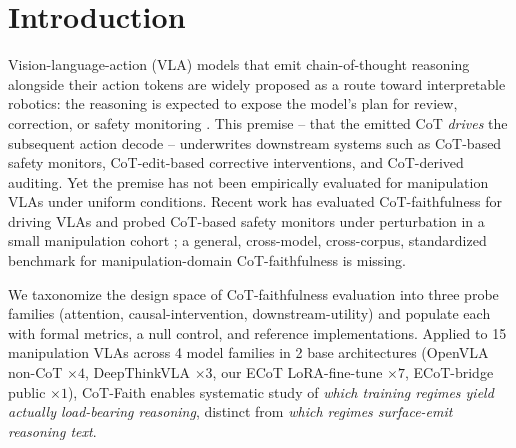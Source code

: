 \documentclass{article}
\begin{document}
\section{Introduction}
\label{sec:intro}

Vision-language-action (VLA) models that emit chain-of-thought reasoning alongside their action tokens are widely proposed as a route toward interpretable robotics: the reasoning is expected to expose the model's plan for review, correction, or safety monitoring \citep{ecot,cotvla,ecotlite,deepthinkvla}. This premise -- that the emitted CoT \emph{drives} the subsequent action decode -- underwrites downstream systems such as CoT-based safety monitors, CoT-edit-based corrective interventions, and CoT-derived auditing. Yet the premise has not been empirically evaluated for manipulation VLAs under uniform conditions. Recent work has evaluated CoT-faithfulness for driving VLAs \citep{vladrivebench,pinocchio} and probed CoT-based safety monitors under perturbation in a small manipulation cohort \citep{doubleedged}; a general, cross-model, cross-corpus, standardized benchmark for manipulation-domain CoT-faithfulness is missing.

We taxonomize the design space of CoT-faithfulness evaluation into three probe families (attention, causal-intervention, downstream-utility) and populate each with formal metrics, a null control, and reference implementations. Applied to 15 manipulation VLAs across 4 model families in 2 base architectures (OpenVLA non-CoT $\times 4$, DeepThinkVLA $\times 3$, our ECoT LoRA-fine-tune $\times 7$, ECoT-bridge public $\times 1$), CoT-Faith enables systematic study of \emph{which training regimes yield actually load-bearing reasoning}, distinct from \emph{which regimes surface-emit reasoning text}.
\end{document}
